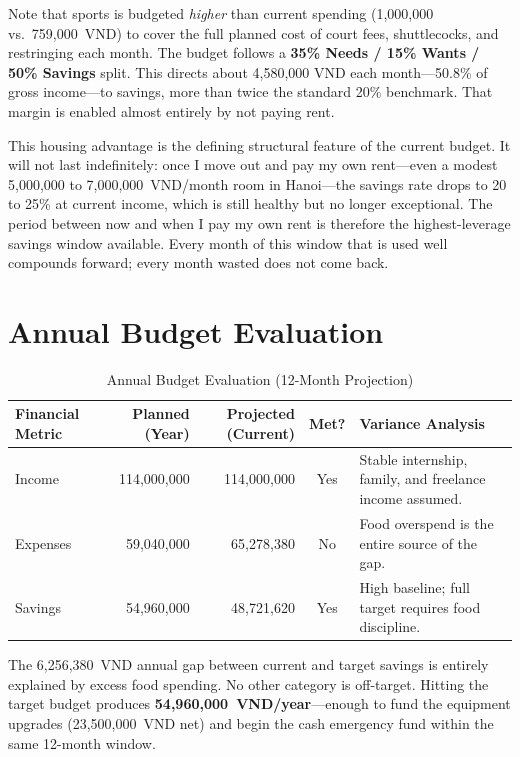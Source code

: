 Note that sports is budgeted \textit{higher} than current spending (1,000,000 vs.\ 759,000~VND) to cover the full planned cost of court fees, shuttlecocks, and restringing each month. The budget follows a \textbf{35\% Needs / 15\% Wants / 50\% Savings} split. This directs about 4,580,000 VND each month---50.8\% of gross income---to savings, more than twice the standard 20\% benchmark. That margin is enabled almost entirely by not paying rent.

This housing advantage is the defining structural feature of the current budget. It will not last indefinitely: once I move out and pay my own rent---even a modest 5,000,000 to 7,000,000~VND/month room in Hanoi---the savings rate drops to 20 to 25\% at current income, which is still healthy but no longer exceptional. The period between now and when I pay my own rent is therefore the highest-leverage savings window available. Every month of this window that is used well compounds forward; every month wasted does not come back.

\section{Annual Budget Evaluation}

\begin{table}[H]
\caption{Annual Budget Evaluation (12-Month Projection)}
\label{tab:annual_budget}
\begin{tabularx}{\linewidth}{@{}lrrcL@{}}
\toprule
\textbf{Financial Metric} & \textbf{Planned (Year)} & \textbf{Projected (Current)} & \textbf{Met?} & \textbf{Variance Analysis} \\
\midrule
Income   & 114,000,000 & 114,000,000 & Yes & Stable internship, family, and freelance income assumed. \\
Expenses &  59,040,000 &  65,278,380 & No  & Food overspend is the entire source of the gap. \\
Savings  &  54,960,000 &  48,721,620 & Yes & High baseline; full target requires food discipline. \\
\bottomrule
\end{tabularx}
\end{table}

The 6,256,380~VND annual gap between current and target savings is entirely explained by excess food spending. No other category is off-target. Hitting the target budget produces \textbf{54,960,000~VND/year}---enough to fund the equipment upgrades (23,500,000~VND net) and begin the cash emergency fund within the same 12-month window.
